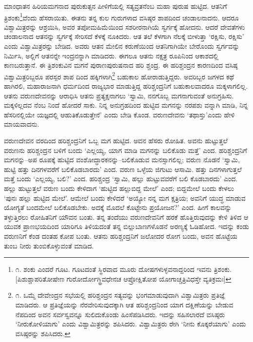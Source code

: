 ಮಾಂಧಾತನ ಹಿರಿಯಮಗನಾದ ಪುರುಕುತ್ಸನ ಪೀಳಿಗೆಯಲ್ಲಿ ಸತ್ಯವ್ರತನೆಂಬ ಮಹಾ ಪುರುಷ ಹುಟ್ಟಿದ. ಆತನಿಗೆ ತ್ರಿಶಂಕು\footnote{೧. ಶಂಕು ಎಂದರೆ ಗೂಟ. ಗೂಟದಂತೆ ಸ್ಥಿರವಾದ ಮೂರು ದೋಷಗಳುಳ್ಳವನಾದ್ದರಿಂದ ಇವನು ತ್ರಿಶಂಕು. [ಪಿಶುಶ್ಚಾಪರಿತೋಷೇಣ ಗುರೋರ್ದೋಗ್ಥ್ರಿವಧೇನಚ ಆಪ್ರೋಕ್ಷಿತೋಪ ಯೋಗಾಚ್ಚತ್ರಿವಿಧಸ್ತೇ ವ್ಯತಿಕ್ರಮಃ]}ವೆಂದು ಹೆಸರಾಯಿತು. ಈತನು ತನ್ನ ಕುಲ ಗುರುಗಳಾದ ವಸಿಷ್ಠರ ಶಾಪದಿಂದ ಚಂಡಾಲನಾದನು. ಆದರೂ ವಿಶ್ವಾಮಿತ್ರರನ್ನು ಆಶ್ರಯಿಸಿ, ಅವರ ತಪೋಮಹಿಮೆಯಿಂದ ಸಶರೀರನಾಗಿಯೆ ಸ್ವರ್ಗಕ್ಕೆ ಹೋದನು. ಆದರೆ ದೇವತೆಗಳು ಚಂಡಾಲನಾದ ಆತನನ್ನು ಸ್ವರ್ಗಕ್ಕೆ ಸೇರಿಸದೆ ಕೆಳಕ್ಕೆ ನೂಕಿದರು. ಆತ ತಲೆ ಕೆಳಗಾಗಿ ನೆಲಕ್ಕೆ ಬೀಳುತ್ತಾ ‘ರಕ್ಷಿಸು, ರಕ್ಷಿಸು’ ಎಂದು ವಿಶ್ವಾಮಿತ್ರರನ್ನು ಬೇಡಿದ. ಅವರು ಆತನ ಮೇಲಿನ ಕರುಣೆಯಿಂದ ಆತನಿಗಾಗಿಯೇ ಬೇರೊಂದು ಸ್ವರ್ಗವನ್ನು ನಿರ್ಮಿಸಿ, ಅಲ್ಲಿಗೆ ಆತನನ್ನೇ ಇಂದ್ರನನ್ನಾಗಿ ಮಾಡಿದರು. ಈಗಲೂ ಆತನು ನಕ್ಷತ್ರ ರೂಪಿನಿಂದ ಆಕಾಶದಲ್ಲಿ ಕಾಣಬರುತ್ತಾನೆ. ಈ ತ್ರಿಶಂಕುವಿನ ಮಗನೆ ಪುರಾಣಪುರುಷನಾದ ಹರಿ ಶ್ಚಂದ್ರ. ಈ ಹರಿಶ್ಚಂದ್ರನ ಕಾರಣದಿಂದ ವಸಿಷ್ಠ ವಿಶ್ವಾಮಿತ್ರರಿಬ್ಬರೂ ಪರಸ್ಪರ ಶಾಪ ದಿಂದ ಹಕ್ಕಿಗಳಾಗಿ\footnote{೧. ಒಮ್ಮೆ ದೇವೇಂದ್ರನ ಸಭೆಯಲ್ಲಿ ಹರಿಶ್ಚಂದ್ರನ ಸತ್ಯವನ್ನು ಭಂಗಮಾಡುವುದಾಗಿ ವಿಶ್ವಾಮಿತ್ರರು ಪ್ರತಿಜ್ಞೆ ಮಾಡಿದರು. ಆ ಪ್ರತಿಜ್ಞೆಯನ್ನು ನೆರವೇರಿಸುವುದಕ್ಕಾಗಿ ಆತ ಹರಿಶ್ಚಂದ್ರನಿಂದ ಯಾಗ ದಕ್ಷಿಣೆಯನ್ನು ಬೇಡುವ ನೆಪದಿಂದ ಅವನ ಸರ್ವಸ್ವವನ್ನೂ ಸುಲಿದುಕೊಂಡು ಹಿಂಸೆಪಡಿಸಿದರು. ಇದನ್ನು ಸಹಿಸಲಾರದೆ ವಸಿಷ್ಠರು ‘ನೀರುಕೋಳಿಯಾಗು’ ಎಂದು ವಿಶ್ವಾಮಿತ್ರರನ್ನು ಶಪಿಸಿದರು. ವಿಶ್ವಾಮಿತ್ರರು ರೇಗಿ ‘ನೀನು ಕೊಕ್ಕರೆಯಾಗು’ ಎಂದು ವಸಿಷ್ಠರನ್ನು ಶಪಿಸಿದರು.} ಬಹುಕಾಲ ಹೋರಾಡುತ್ತಿದ್ದರು. ಅವರಿಬ್ಬರ ಜಗಳದ ಕಥೆ ಹಾಗಿರಲಿ, ಮಹಾರಾಜನಾಗಿ ಧರ್ಮದಿಂದ ರಾಜ್ಯಭಾರ ಮಾಡುತ್ತಿದ್ದ ಹರಿಶ್ಚಂದ್ರನಿಗೆ ಬಹುಕಾಲವಾದರೂ ಮಕ್ಕಳಾಗಲಿಲ್ಲ. ಆತನು ವರುಣದೇವನನ್ನು ಆರಾಧಿಸಿ ಆತನು ಪ್ರತ್ಯಕ್ಷನಾಗಲು ‘ಸ್ವಾಮಿ, ನನಗೊಬ್ಬ ಮಗನಾಗುವಂತೆ ಅನುಗ್ರಹಿಸು. ಮಕ್ಕಳಿಲ್ಲದವ ನೆಂಬ ನಿಂದೆ ಹೋದರೆ ಸಾಕು. ನಿನ್ನ ಅನುಗ್ರಹದಿಂದ ಹುಟ್ಟಿದ ಮಗನನ್ನು ನರಪಶು ವನ್ನಾಗಿ ಮಾಡಿ, ನಿನ್ನ ಹೆಸರಿನಲ್ಲಿಯೇ ಯಜ್ಞದಲ್ಲಿ ಆಹುತಿಕೊಡುತ್ತೇನೆ’ ಎಂದು ಬೇಡಿ ಕೊಂಡ. ವರುಣದೇವನು ‘ತಥಾಸ್ತು’ಎಂದು ಹೇಳಿ ಮಾಯವಾದನು.

ವರುಣದೇವನ ವರದಿಂದ ಹರಿಶ್ಚಂದ್ರನಿಗೆ ಒಬ್ಬ ಮಗ ಹುಟ್ಟಿದ. ಅವನ ಹೆಸರು ರೋಹಿತ. ಅವನು ಹುಟ್ಟುತ್ತಲೆ ವರುಣನು ಹರಿಶ್ಚಂದ್ರನ ಬಳಿಗೆ ಬಂದು ‘ಎಲ್ಲಯ್ಯ, ಯಾಗ ಮಾಡಿ ಮಗನನ್ನು ಬಲಿಕೊಡು ಮತ್ತೆ’ ಎಂದ. ಹರಿಶ್ಚಂದ್ರನಿಗೆ ಮಗನನ್ನು–ಅಪ ರೂಪಕ್ಕೆ ಹುಟ್ಟಿದ ವಂಶೋದ್ಧಾರಕನನ್ನು–ಬಲಿಕೊಡುವ ಮನಸ್ಸಾಗಲಿಲ್ಲ; ವರುಣ ನೊಡನೆ ‘ಸ್ವಾಮಿ, ಹುಟ್ಟಿ ಹತ್ತು ದಿನಗಳವರೆಗೆ ಬಲಿಕೊಡಬಾರದು’ ಎಂದ. ವರುಣ ಒಳ್ಳೆಯ ಜಿಗುಟು ಆಸಾಮಿ. ಹತ್ತು ದಿನಗಳಾಗುತ್ತಲೆ ಮತ್ತೆ ಬಂದು ‘ಎಲ್ಲಯ್ಯ, ಬಲಿ?’ ಎಂದ. ಹರಿಶ್ಚಂದ್ರ ‘ಸ್ವಾಮಿ, ಹಲ್ಲು ಹುಟ್ಟುವವರೆಗೆ ಬಲಿ ಕೊಡಬಾರದು’ ಎಂದ. ಹಲ್ಲು ಹುಟ್ಟುತ್ತಲೆ ವರುಣ ಬಂದು ಕೇಳಿದಾಗ ‘ಹುಟ್ಟಿದ ಹಲ್ಲುಬಿದ್ದ ಮೇಲೆ’ ಎಂದ; ಬಿದ್ದಮೇಲೆ ಬಂದು ಕೇಳಲು ‘ಪುನಃ ಹಲ್ಲು ಹುಟ್ಟಿದ ಮೇಲೆ’. ಆಮೇಲೆ ಬಂದು ಕೇಳಿದರೆ ‘ಅಯ್ಯೋ ನನ್ನ ಮಗ ಕ್ಷತ್ರಿಯ; ಅವನಿಗೆ ಯುದ್ಧ ಮಾಡುವ ಯೋಗ್ಯತೆ ಬಂದಮೇಲೆ ಬಲಿಕೊಡಬೇಕು. ಅದಕ್ಕೆ ಮೊದಲೆ ಕೊಟ್ಟೇನು ಪ್ರಯೋಜನ?’ ಎಂದ. ಹೀಗೆ ಕಾಲವನ್ನು ತಳ್ಳುತ್ತಿರಲು ರೋಹಿತನಿಗೆ ಯೌವನ ಬಂತು. ತನ್ನ ತಂದೆಯು ವರುಣದೇವನಿಗೆ ಹರಕೆ ಹೊತ್ತಿರುವುದನ್ನು ಕೇಳಿ ತಿಳಿದ ಆ ಯುವಕ ಪ್ರಾಣಭಯದಿಂದ ಯಾರಿಗೂ ತಿಳಿಯದಂತೆ ತನ್ನ ಬಿಲ್ಲುಬಾಣಗಳೊಡನೆ ಅರಣ್ಯಕ್ಕೆ ಓಡಿಹೋದ. ಇದನ್ನು ಕಂಡು ವರುಣನಿಗೆ ಕೆಂಡ ದಂತಹ ಕೋಪ ಬಂತು. ಆತನು ಹರಿಶ್ಚಂದ್ರನಿಗೆ ಜಲೋದರ ರೋಗ ಬಂದು, ಅವನ ಹೊಟ್ಟೆಯ ತುಂಬ ನೀರು ತುಂಬಿಕೊಳ್ಳುವಂತೆ ಮಾಡಿದ.

